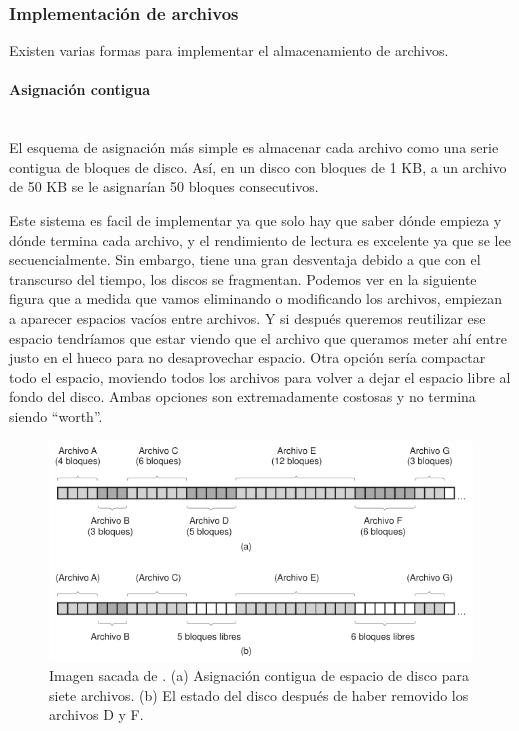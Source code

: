 \documentclass[12pt]{article}
\begin{document}
  \subsubsection{Implementación de archivos}
  Existen varias formas para implementar el almacenamiento de archivos.

  \paragraph{Asignación contigua}\mbox{}\\
  El esquema de asignación más simple es almacenar cada archivo como una serie contigua de bloques de disco. Así, en un disco con bloques de 1 KB, a un archivo de 50 KB se le asignarían 50 bloques consecutivos.

  Este sistema es facil de implementar ya que solo hay que saber dónde empieza y dónde termina cada archivo, y el rendimiento de lectura es excelente ya que se lee secuencialmente. Sin embargo, tiene una gran desventaja debido a que con el transcurso del tiempo, los discos se fragmentan. Podemos ver en la siguiente figura que a medida que vamos eliminando o modificando los archivos, empiezan a aparecer espacios vacíos entre archivos. Y si después queremos reutilizar ese espacio tendríamos que estar viendo que el archivo que queramos meter ahí entre justo en el hueco para no desaprovechar espacio. Otra opción sería compactar todo el espacio, moviendo todos los archivos para volver a dejar el espacio libre al fondo del disco. Ambas opciones son extremadamente costosas y no termina siendo ``worth''.

  \begin{figure}[H]
    \centering
    \includegraphics[width=0.8\linewidth]{imagenes/asignacion-contigua.png}
    \caption{Imagen sacada de \parencite{tanenbaum}. (a) Asignación contigua de espacio de disco para siete archivos. (b) El estado del disco después de haber removido los archivos D y F.}
    \label{fig:asignacion-contigua}
  \end{figure}
  
\end{document}
